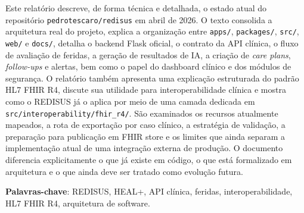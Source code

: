 \documentclass[
    12pt,
    openright,
    oneside,
    a4paper,
    chapter=TITLE,
    section=TITLE,
    brazil,
    sumario=tradicional,
    hidelinks
]{abntex2}
\begin{document}
\imprimircapa
\imprimirfolhaderosto*

\begin{resumo}
Este relat\'orio descreve, de forma t\'ecnica e detalhada, o estado atual do reposit\'orio \texttt{pedrotescaro/redisus} em abril de 2026. O texto consolida a arquitetura real do projeto, explica a organiza\c{c}\~ao entre \texttt{apps/}, \texttt{packages/}, \texttt{src/}, \texttt{web/} e \texttt{docs/}, detalha o backend Flask oficial, o contrato da API cl\'inica, o fluxo de avalia\c{c}\~ao de feridas, a gera\c{c}\~ao de resultados de IA, a cria\c{c}\~ao de \textit{care plans}, \textit{follow-ups} e alertas, bem como o papel do dashboard cl\'inico e dos m\'odulos de seguran\c{c}a. O relat\'orio tamb\'em apresenta uma explica\c{c}\~ao estruturada do padr\~ao HL7 FHIR R4, discute sua utilidade para interoperabilidade cl\'inica e mostra como o REDISUS j\'a o aplica por meio de uma camada dedicada em \texttt{src/interoperability/fhir\_r4/}. S\~ao examinados os recursos atualmente mapeados, a rota de exporta\c{c}\~ao por caso cl\'inico, a estrat\'egia de valida\c{c}\~ao, a prepara\c{c}\~ao para publica\c{c}\~ao em FHIR store e os limites que ainda separam a implementa\c{c}\~ao atual de uma integra\c{c}\~ao externa de produ\c{c}\~ao. O documento diferencia explicitamente o que j\'a existe em c\'odigo, o que est\'a formalizado em arquitetura e o que ainda deve ser tratado como evolu\c{c}\~ao futura.

\textbf{Palavras-chave}: REDISUS, HEAL+, API cl\'inica, feridas, interoperabilidade, HL7 FHIR R4, arquitetura de software.
\end{resumo}
\end{document}
